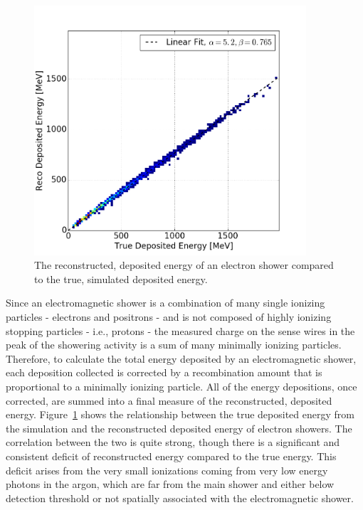 \begin{figure}[htb]
   \centering
   \includegraphics[width=0.9\textwidth]{emshower_figures/depositedEnergyCalibration.png}
   \caption{The reconstructed, deposited energy of an electron shower compared to the true, simulated deposited energy.}
   \label{fig:depositedE}
 \end{figure} 

Since an electromagnetic shower is a combination of many single ionizing particles - electrons and positrons - and is not composed of highly ionizing stopping particles - i.e., protons - the measured charge on the sense wires in the peak of the showering activity is a sum of many minimally ionizing particles.  Therefore, to calculate the total energy deposited by an electromagnetic shower, each deposition collected is corrected by a recombination amount that is proportional to a minimally ionizing particle.  All of the energy depositions, once corrected, are summed into a final measure of the reconstructed, deposited energy.  Figure~\ref{fig:depositedE} shows the relationship between the true deposited energy from the simulation and the reconstructed deposited energy of electron showers.  The correlation between the two is quite strong, though there is a significant and consistent deficit of reconstructed energy compared to the true energy.  This deficit arises from the very small ionizations coming from very low energy photons in the argon, which are far from the main shower and either below detection threshold or not spatially associated with the electromagnetic shower.

